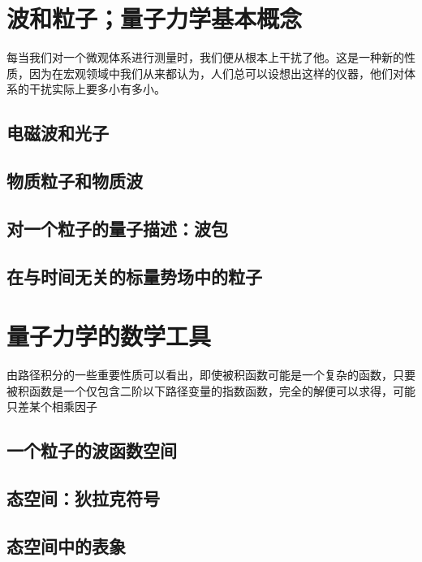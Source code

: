 









\maketitle
{}
\tableofcontents\newpage
{}

\setcounter{page}{1}
\section{波和粒子；量子力学基本概念}
每当我们对一个微观体系进行测量时，我们便从根本上干扰了他。这是一种新的性质，因为在宏观领域中我们从来都认为，人们总可以设想出这样的仪器，他们对体系的干扰实际上要多小有多小。\cite{Cohen}
\subsection{电磁波和光子}
\subsection{物质粒子和物质波}%
\subsection{对一个粒子的量子描述：波包}
\subsection{在与时间无关的标量势场中的粒子}
\section{量子力学的数学工具}
由路径积分的一些重要性质可以看出，即使被积函数可能是一个复杂的函数，只要被积函数是一个仅包含二阶以下路径变量的指数函数，完全的解便可以求得，可能只差某个相乘因子\cite{Fymman}
\subsection{一个粒子的波函数空间}
\subsection{态空间：狄拉克符号}
\subsection{态空间中的表象}

